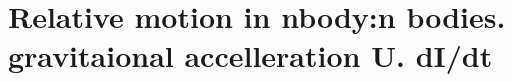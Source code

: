 \section{ Relative motion in nbody:n bodies. gravitaional accelleration U. dI/dt  }\label{sec:q1}    
